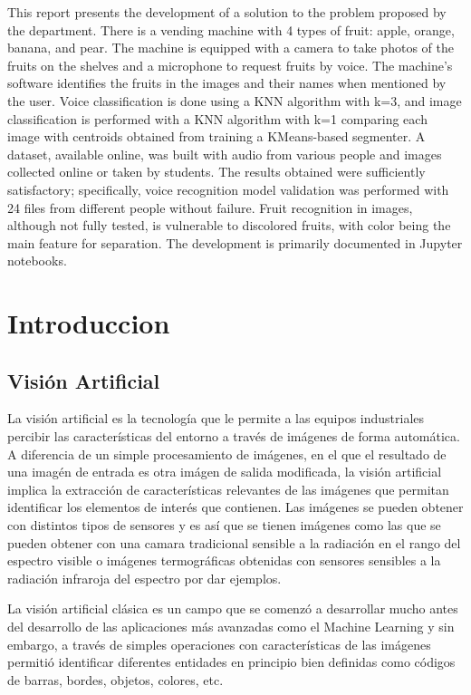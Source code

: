 \documentclass[a4paper, 12pt]{article}
\begin{document}
This report presents the development of a solution to the problem proposed by the department. There is a vending machine with 4 types of fruit: apple, orange, banana, and pear. The machine is equipped with a camera to take photos of the fruits on the shelves and a microphone to request fruits by voice. The machine's software identifies the fruits in the images and their names when mentioned by the user. Voice classification is done using a KNN algorithm with k=3, and image classification is performed with a KNN algorithm with k=1 comparing each image with centroids obtained from training a KMeans-based segmenter. A dataset, available online, was built with audio from various people and images collected online or taken by students. The results obtained were sufficiently satisfactory; specifically, voice recognition model validation was performed with 24 files from different people without failure. Fruit recognition in images, although not fully tested, is vulnerable to discolored fruits, with color being the main feature for separation. The development is primarily documented in Jupyter notebooks.

\section{Introduccion}
\subsection{Visión Artificial}
La visión artificial es la tecnología que le permite a las equipos industriales percibir las características del entorno a través de imágenes de forma automática. A diferencia de un simple procesamiento de imágenes, en el que el resultado de una imagén de entrada es otra imágen de salida modificada, la visión artificial implica la extracción de características relevantes de las imágenes que permitan identificar los elementos de interés que contienen. Las imágenes se pueden obtener con distintos tipos de sensores y es así que se tienen imágenes como las que se pueden obtener con una camara tradicional sensible a la radiación en el rango del espectro visible o imágenes termográficas obtenidas con sensores sensibles a la radiación infraroja del espectro por dar ejemplos.

La visión artificial clásica es un campo que se comenzó a desarrollar mucho antes del desarrollo de las aplicaciones más avanzadas como el Machine Learning y sin embargo, a través de simples operaciones con características de las imágenes permitió identificar diferentes entidades en principio bien definidas como códigos de barras, bordes, objetos, colores, etc.
\end{document}

